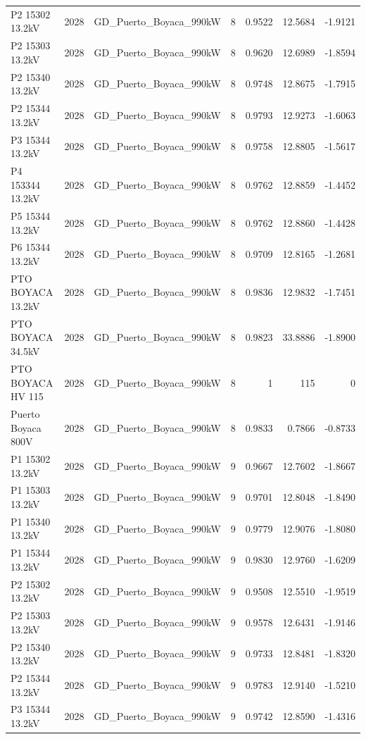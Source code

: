 \documentclass[11pt,a4paper]{article}
\begin{document}
\begin{longtable}{llllrrr}
P2 15302 13.2kV & 2028 & GD\_Puerto\_Boyaca\_990kW & 8 & 0.9522 & 12.5684 & -1.9121 \\
P2 15303 13.2kV & 2028 & GD\_Puerto\_Boyaca\_990kW & 8 & 0.9620 & 12.6989 & -1.8594 \\
P2 15340 13.2kV & 2028 & GD\_Puerto\_Boyaca\_990kW & 8 & 0.9748 & 12.8675 & -1.7915 \\
P2 15344 13.2kV & 2028 & GD\_Puerto\_Boyaca\_990kW & 8 & 0.9793 & 12.9273 & -1.6063 \\
P3 15344 13.2kV & 2028 & GD\_Puerto\_Boyaca\_990kW & 8 & 0.9758 & 12.8805 & -1.5617 \\
P4 153344 13.2kV & 2028 & GD\_Puerto\_Boyaca\_990kW & 8 & 0.9762 & 12.8859 & -1.4452 \\
P5 15344 13.2kV & 2028 & GD\_Puerto\_Boyaca\_990kW & 8 & 0.9762 & 12.8860 & -1.4428 \\
P6 15344 13.2kV & 2028 & GD\_Puerto\_Boyaca\_990kW & 8 & 0.9709 & 12.8165 & -1.2681 \\
PTO BOYACA 13.2kV & 2028 & GD\_Puerto\_Boyaca\_990kW & 8 & 0.9836 & 12.9832 & -1.7451 \\
PTO BOYACA 34.5kV & 2028 & GD\_Puerto\_Boyaca\_990kW & 8 & 0.9823 & 33.8886 & -1.8900 \\
PTO BOYACA HV 115 & 2028 & GD\_Puerto\_Boyaca\_990kW & 8 & 1 & 115 & 0 \\
Puerto Boyaca 800V & 2028 & GD\_Puerto\_Boyaca\_990kW & 8 & 0.9833 & 0.7866 & -0.8733 \\
P1 15302 13.2kV & 2028 & GD\_Puerto\_Boyaca\_990kW & 9 & 0.9667 & 12.7602 & -1.8667 \\
P1 15303 13.2kV & 2028 & GD\_Puerto\_Boyaca\_990kW & 9 & 0.9701 & 12.8048 & -1.8490 \\
P1 15340 13.2kV & 2028 & GD\_Puerto\_Boyaca\_990kW & 9 & 0.9779 & 12.9076 & -1.8080 \\
P1 15344 13.2kV & 2028 & GD\_Puerto\_Boyaca\_990kW & 9 & 0.9830 & 12.9760 & -1.6209 \\
P2 15302 13.2kV & 2028 & GD\_Puerto\_Boyaca\_990kW & 9 & 0.9508 & 12.5510 & -1.9519 \\
P2 15303 13.2kV & 2028 & GD\_Puerto\_Boyaca\_990kW & 9 & 0.9578 & 12.6431 & -1.9146 \\
P2 15340 13.2kV & 2028 & GD\_Puerto\_Boyaca\_990kW & 9 & 0.9733 & 12.8481 & -1.8320 \\
P2 15344 13.2kV & 2028 & GD\_Puerto\_Boyaca\_990kW & 9 & 0.9783 & 12.9140 & -1.5210 \\
P3 15344 13.2kV & 2028 & GD\_Puerto\_Boyaca\_990kW & 9 & 0.9742 & 12.8590 & -1.4316 \\

\end{longtable}
\end{document}
